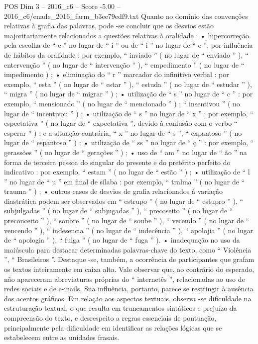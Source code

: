 \begin{textsample}{POS Dim 3 – 2016\_c6 – Score -5.00 – 2016\_c6/enade\_2016\_farm\_b3ee79edf9.txt}
Quanto ao domínio das convenções relativas à grafia das palavras, pode -se concluir que os desvios estão majoritariamente relacionados a questões relativas à oralidade : • hipercorreção pela escolha de “ e ” no lugar de “ i ” ou de “ i ” no lugar de “ e ”, por influência de hábitos da oralidade : por exemplo, “ inviado ” ( no lugar de “ enviado ” ), “ entervenção ” ( no lugar de “ intervenção ” ), “ empedimento ” ( no lugar de “ impedimento ) ; • eliminação do “ r ” marcador do infinitivo verbal : por exemplo, “ esta ” ( no lugar de “ estar ” ), “ estuda ” ( no lugar de “ estudar ” ), “ migra ” ( no lugar de “ migrar ” ) ; • utilização de “ s ” no lugar de “ c ” : por exemplo, “ mensionado ” ( no lugar de “ mencionado ” ) ; “ insentivou ” ( no lugar de “ incentivou ” ) ; • utilização de “ s ” no lugar de “ x ” : por exemplo, “ espectativa ” ( no lugar de “ expectativa ”, devido à confusão com o verbo “ esperar ” ) ; e a situação contrária, “ x ” no lugar de “ s ”, “ expantoso ” ( no lugar de “ espantoso ” ) ; • utilização de “ ss ” no lugar de “ ç ” : por exemplo, “ gerassões ” ( no lugar de “ gerações ” ) ; • uso de “ am ” no lugar de “ ão ” na forma de terceira pessoa do singular do presente e do pretérito perfeito do indicativo : por exemplo, “ estam ” ( no lugar de “ estão ” ) ; • utilização de “ l ” no lugar de “ u ” em final de sílaba : por exemplo, “ tralma ” ( no lugar de “ trauma ” ) ; • outros casos de desvios de grafia relacionados à variação diastrática podem ser observados em “ estrupo ” ( no lugar de “ estupro ” ), “ subjulgadas ” ( no lugar de “ subjugadas ” ), “ precoseito ” ( no lugar de “ preconceito ” ), “ soubre ” ( no lugar de “ soube ” ), “ vecendo ” ( no lugar de “ vencendo ” ), “ indesencia ” ( no lugar de “ indecência ” ), “ apolojia ” ( no lugar de “ apologia ” ), “ fulga ” ( no lugar de “ fuga ” ). • inadequação no uso da maiúscula para destacar determinadas palavras-chave do texto, como “ Violência ”, “ Brasileiros ”.
Destaque -se, também, a ocorrência de participantes que grafam os textos inteiramente em caixa alta.
Vale observar que, ao contrário do esperado, não apareceram abreviaturas próprias do “ internetês ”, relacionadas ao uso de redes sociais e de e-mails.
Sua influência, portanto, parece se restringir à ausência dos acentos gráficos.
Em relação aos aspectos textuais, observa -se dificuldade na estruturação textual, o que resulta em truncamentos sintáticos e prejuízo da compreensão do texto, e desrespeito a regras essenciais de pontuação, principalmente pela dificuldade em identificar as relações lógicas que se estabelecem entre as unidades frasais.

\end{textsample}
